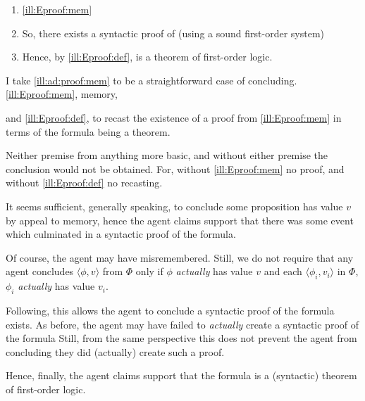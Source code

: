 \begin{note}
  \begin{illustration}[\adA{}]
    \label{ill:ad:proof:mem}
    \mbox{}
    \vspace{-\baselineskip}
    \begin{enumerate}[%
      label=\arabic*,%
      ref=({I}.{\ref{ill:ad:proof:mem}}:\arabic*)%
      ]
    \item \illEproofMem{} \hfill \ref{ill:Eproof:mem}
    \item
      \label{ill:Eproof:exP}
      So, there exists a syntactic proof of  (using a sound first-order system)
    \item
      \label{ill:Eproof:thm}
      Hence, by \ref{ill:Eproof:def},  is a theorem of first-order logic.
    \end{enumerate}
    \vspace{-\baselineskip}
  \end{illustration}
\end{note}

\begin{note}
  I take \autoref{ill:ad:proof:mem} to be a straightforward case of concluding.
  \ref{ill:Eproof:mem}, memory,


  and \ref{ill:Eproof:def}, to recast the existence of a proof from \ref{ill:Eproof:mem} in terms of the formula being a theorem.

  Neither premise from anything more basic, and without either premise the conclusion would not be obtained.
  For, without \ref{ill:Eproof:mem} no proof, and without \ref{ill:Eproof:def} no recasting.
\end{note}

\begin{note}
  It seems sufficient, generally speaking, to conclude some proposition has value \(v\) by appeal to memory, hence the agent claims support that there was some event which culminated in a syntactic proof of the formula.

  Of course, the agent may have misremembered.
  Still, we do not require that any agent concludes \(\langle \phi,v \rangle\) from \(\Phi\) only if \(\phi\) \emph{actually} has value \(v\) and each \(\langle \phi_{i},v_{i} \rangle\) in \(\Phi\), \(\phi_{i}\) \emph{actually} has value \(v_{i}\).

  Following, this allows the agent to conclude a syntactic proof of the formula exists.
  As before, the agent may have failed to \emph{actually} create a syntactic proof of the formula
  Still, from the same perspective this does not prevent the agent from concluding they did (actually) create such a proof.

  Hence, finally, the agent claims support that the formula is a (syntactic) theorem of first-order logic.
\end{note}

